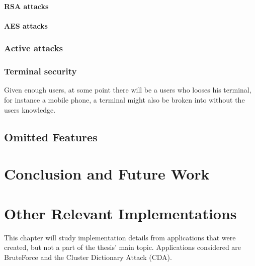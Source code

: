 \documentclass[pdftex,english,10pt,b5paper,twoside]{book}
\begin{document}
\subsubsection{RSA attacks}

\subsubsection{AES attacks}

\subsection{Active attacks}


\subsection{Terminal security}
Given enough users, at some point there will be a users who looses his
terminal, for instance a mobile phone, a terminal might also be broken into
without the users knowledge.


\section{Omitted Features}


\chapter{Conclusion and Future Work}




\appendix
\appendixpage
\addappheadtotoc
\chapter{Other Relevant Implementations}
\label{ap:RI}

This chapter will study implementation details from applications that were
created, but not a part of the thesis' main topic. Applications considered are
BruteForce and the Cluster Dictionary Attack (CDA).
\end{document}
